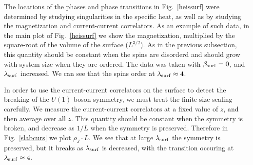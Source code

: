 \documentclass[prb,twocolumn]{revtex4-1}
\begin{document}
The locations of the phases and phase transitions in Fig.~\ref{heissurf} were determined by studying singularities in the specific heat, as well as by studying the magnetization and current-current correlators. As an example of such data, in the main plot of Fig.~\ref{heissurf} we show the magnetization, multiplied by the square-root of the volume of the surface ($L^{3/2}$). As in the previous subsection, this quantity should be constant when the spins are disorderd and should grow with system size when they are ordered. The data was taken with $\beta_{\rm surf}=0$, and $\lambda_{\rm surf}$ increased. We can see that the spins order at $\lambda_{\rm surf}\approx4$. 

In order to use the current-current correlators on the surface to detect the breaking of the $U(1)$ boson symmetry, we must treat the finite-size scaling carefully. We measure the current-current correlators at a fixed value of $z$, and then average over all $z$. This quantity should be constant when the symmetry is broken, and decrease as $1/L$ when the symmetry is preserved. Therefore in Fig.~\ref{slabcurs} we plot $\rho_J\cdot L$. We see that at large $\lambda_{\rm surf}$ the symmetry is preserved, but it breaks as $\lambda_{\rm surf}$ is decreased, with the transition occuring at $\lambda_{\rm surf}\approx 4$. 
\end{document}
